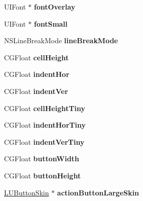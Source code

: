 \begin{DoxyCompactItemize}
U\+I\+Font $\ast$ {\bfseries font\+Overlay}
\item 
\mbox{\label{interface_l_u_theme_ab35f0b1e02eb72c8026d659badcf3496}} 
U\+I\+Font $\ast$ {\bfseries font\+Small}
\item 
\mbox{\label{interface_l_u_theme_ac7beec8e0d04f06781f4ea4f27b17b04}} 
N\+S\+Line\+Break\+Mode {\bfseries line\+Break\+Mode}
\item 
\mbox{\label{interface_l_u_theme_a3b7ace501691cd608bba460dc3b840b2}} 
C\+G\+Float {\bfseries cell\+Height}
\item 
\mbox{\label{interface_l_u_theme_a5a4b606f05dac2454178f70e8c9ab7a5}} 
C\+G\+Float {\bfseries indent\+Hor}
\item 
\mbox{\label{interface_l_u_theme_a8c73e5aab2961e12ccf5892530efc143}} 
C\+G\+Float {\bfseries indent\+Ver}
\item 
\mbox{\label{interface_l_u_theme_ae340d71163254b883b40be5878687095}} 
C\+G\+Float {\bfseries cell\+Height\+Tiny}
\item 
\mbox{\label{interface_l_u_theme_a29c8d544698cd9b6da582911e09b1f2a}} 
C\+G\+Float {\bfseries indent\+Hor\+Tiny}
\item 
\mbox{\label{interface_l_u_theme_a027fca514a53256ab167dca18df0a4de}} 
C\+G\+Float {\bfseries indent\+Ver\+Tiny}
\item 
\mbox{\label{interface_l_u_theme_adc80308b082a39b871202e8a287dc87d}} 
C\+G\+Float {\bfseries button\+Width}
\item 
\mbox{\label{interface_l_u_theme_a0b98f7a91745656ced0adcc912cbea50}} 
C\+G\+Float {\bfseries button\+Height}
\item 
\mbox{\label{interface_l_u_theme_a1e7432c54d2486c2f54434e7127007c1}} 
\mbox{\hyperlink{interface_l_u_button_skin}{L\+U\+Button\+Skin}} $\ast$ {\bfseries action\+Button\+Large\+Skin}
\item 

\end{DoxyCompactItemize}
